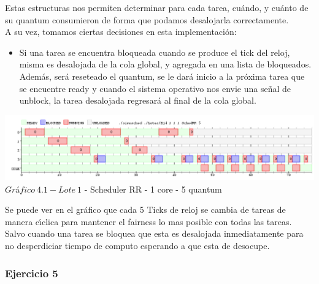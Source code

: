 Estas estructuras nos permiten determinar para cada tarea, cuándo, y cuánto 
de su quantum consumieron de forma que podamos desalojarla correctamente.\\

A su vez, tomamos ciertas decisiones en esta implementación:
\begin{itemize}
 \item Si una tarea se encuentra bloqueada cuando se produce el tick del reloj, misma es desalojada
de la cola global, y agregada en una lista de bloqueados. Además, ser\'{a} reseteado el quantum, se le
dará inicio a la próxima tarea que se encuentre ready y cuando el sistema operativo nos envie una
señal de unblock, la tarea desalojada regresará al final de la cola global.

\end{itemize}

\begin{center}

    
	\includegraphics[width=450pt]{./Test/Ej4.png}
	{$Gr$\'a$fico \ 4.1 - Lote \ 1$ - Scheduler RR - 1 core - 5 quantum}	
 
\end{center}

Se puede ver en el gr\'{a}fico que cada 5 Ticks de reloj se cambia de tareas de manera c\'{\i}clica para mantener 
el fairness lo mas posible con todas las tareas. Salvo cuando una tarea se bloquea que esta es desalojada inmediatamente 
para no desperdiciar tiempo de computo esperando a que esta de desocupe.

\subsubsection[Resolución Ejercicio 5]{Ejercicio 5}

